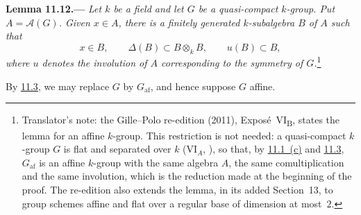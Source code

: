 
\medskip
{}\label{lem:sga3-VIB-11.12}%
\noindent\textbf{Lemma 11.12.---}
\emph{Let \(k\) be a field and let \(G\) be a quasi-compact
\(k\)-group. Put \(A=\mathcal A(G)\). Given \(x\in A\),
there is a finitely generated \(k\)-subalgebra \(B\) of
\(A\) such that}
\[
  x\in B,\qquad
  \Delta(B)\subset B\otimes_kB,\qquad
  u(B)\subset B,
\]
\emph{where \(u\) denotes the involution of \(A\)
corresponding to the symmetry of \(G\).}\footnote{Translator's note: the Gille--Polo re-edition (2011),
Expos\'e~VI\textsubscript{B}, states the lemma for an affine \(k\)-group. This restriction is not needed: a
quasi-compact \(k\)-group \(G\) is flat and separated over \(k\) (VI\(_A\), ), so that,
by \hyperref[concl:sga3-VIB-11.1-c]{11.1~(c)} and \hyperref[def:sga3-VIB-11.3]{11.3}, \(G_{\mathrm{af}}\) is an affine
\(k\)-group with the same algebra \(A\), the same comultiplication and the same involution, which is the
reduction made at the beginning of the proof. The re-edition also extends the lemma, in its added Section~13, to
group schemes affine and flat over a regular base of dimension at most~\(2\).}

By \hyperref[def:sga3-VIB-11.3]{11.3}, we may replace \(G\) by
\(G_{\mathrm{af}}\), and hence suppose \(G\) affine.

